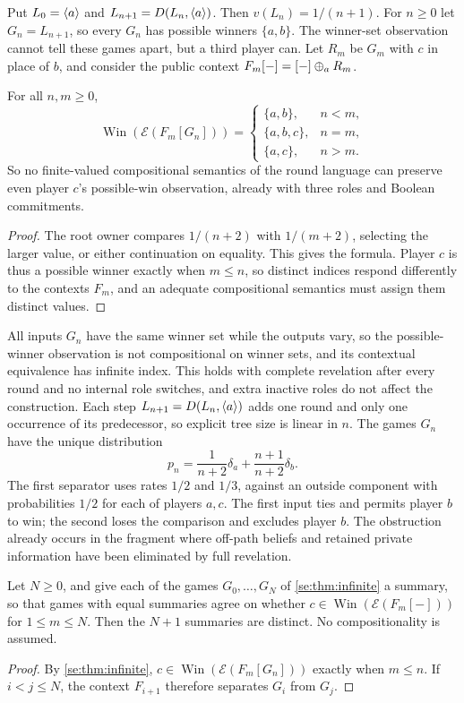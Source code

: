 Put $L_0=\langle a\rangle$ and $L_{n+1}=D(L_n,\langle a\rangle)$. Then $v(L_n)=1/(n+1)$. For $n\geq0$ let $G_n=L_{n+1}$, so every $G_n$ has possible winners $\{a,b\}$. The winner-set observation cannot tell these games apart, but a third player can. Let $R_m$ be $G_m$ with $c$ in place of $b$, and consider the public context $F_m[-]=[-]\mathbin{\oplus_{a}} R_m$.

\begin{theorem}\label{se:thm:infinite}
For all $n,m\geq0$,
\[
 \operatorname{Win}(\mathcal E(F_m[G_n]))=
 \begin{cases}
 \{a,b\},&n<m,\\
 \{a,b,c\},&n=m,\\
 \{a,c\},&n>m.
 \end{cases}
\]
So no finite-valued compositional semantics of the round language can preserve even player $c$'s possible-win observation, already with three roles and Boolean commitments.
\end{theorem}
\begin{proof}
The root owner compares $1/(n+2)$ with $1/(m+2)$, selecting the larger value, or either continuation on equality. This gives the formula. Player $c$ is thus a possible winner exactly when $m\leq n$, so distinct indices respond differently to the contexts $F_m$, and an adequate compositional semantics must assign them distinct values.
\end{proof}

All inputs $G_n$ have the same winner set while the outputs vary, so the possible-winner observation is not compositional on winner sets, and its contextual equivalence has infinite index. This holds with complete revelation after every round and no internal role switches, and extra inactive roles do not affect the construction.
Each step $L_{n+1}=D(L_n,\langle a\rangle)$ adds one round and only one occurrence of its predecessor, so explicit tree size is linear in $n$. The games $G_n$ have the unique distribution
\[
 p_n=\frac1{n+2}\delta_a+\frac{n+1}{n+2}\delta_b.
\]
The first separator uses rates $1/2$ and $1/3$, against an outside component with probabilities $1/2$ for each of players $a,c$. The first input ties and permits player $b$ to win; the second loses the comparison and excludes player $b$. The obstruction already occurs in the fragment where off-path beliefs and retained private information have been eliminated by
full revelation.

\begin{proposition}\label{se:prop:threshold-states}
Let $N\geq0$, and give each of the games $G_0,\ldots,G_N$ of
\cref{se:thm:infinite} a summary, so that games with equal summaries
agree on whether $c\in\operatorname{Win}(\mathcal E(F_m[-]))$ for
$1\leq m\leq N$. Then the $N+1$ summaries are distinct. No
compositionality is assumed.
\end{proposition}
\begin{proof}
By \cref{se:thm:infinite}, $c\in\operatorname{Win}(\mathcal E(F_m[G_n]))$
exactly when $m\leq n$. If $i<j\leq N$, the context $F_{i+1}$ therefore
separates $G_i$ from $G_j$.
\end{proof}

